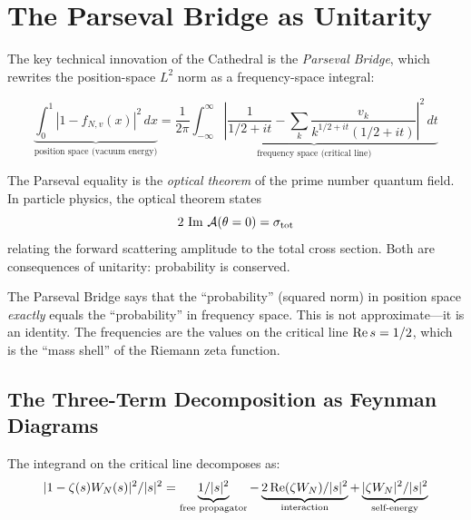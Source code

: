 \documentclass[11pt,a4paper]{article}
\begin{document}
\section{The Parseval Bridge as Unitarity}
\label{sec:parseval}

The key technical innovation of the Cathedral is the \emph{Parseval Bridge},
which rewrites the position-space $L^2$ norm as a frequency-space integral:

\[
  \underbrace{\int_0^1 |1 - f_{N,v}(x)|^2\,dx}_{\text{position space (vacuum energy)}}
  = \frac{1}{2\pi}\underbrace{\int_{-\infty}^{\infty}
  \left|\frac{1}{1/2+it} - \sum_k \frac{v_k}{k^{1/2+it}(1/2+it)}\right|^2\,dt}_{\text{frequency space (critical line)}}
\]

\begin{principle}
The Parseval equality is the \emph{optical theorem} of the prime number
quantum field. In particle physics, the optical theorem states
\[
  2\,\operatorname{Im}\,\mathcal{A}(\theta=0) = \sigma_{\mathrm{tot}}
\]
relating the forward scattering amplitude to the total cross section.
Both are consequences of unitarity: probability is conserved.

The Parseval Bridge says that the ``probability'' (squared norm) in
position space \emph{exactly} equals the ``probability'' in frequency
space. This is not approximate---it is an identity. The frequencies
are the values on the critical line $\operatorname{Re} s = 1/2$, which is the
``mass shell'' of the Riemann zeta function.
\end{principle}

\subsection{The Three-Term Decomposition as Feynman Diagrams}

The integrand on the critical line decomposes as:
\[
  |1 - \zeta(s)W_N(s)|^2 / |s|^2
  = \underbrace{1/|s|^2}_{\text{free propagator}}
  - \underbrace{2\operatorname{Re}(\zeta W_N)/|s|^2}_{\text{interaction}}
  + \underbrace{|\zeta W_N|^2/|s|^2}_{\text{self-energy}}
\]
\end{document}
